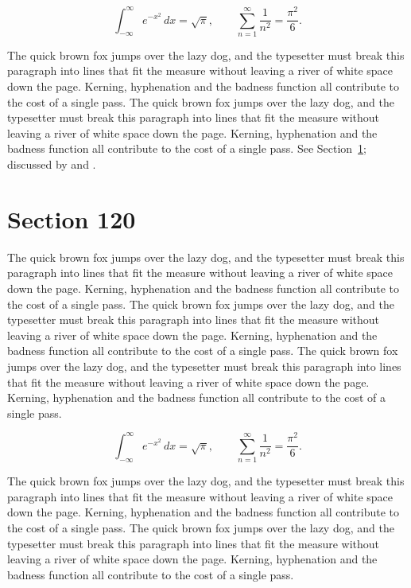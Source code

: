 \documentclass{article}
\begin{document}
\begin{equation}\label{eq:119}
\int_{-\infty}^{\infty} e^{-x^{2}}\,dx = \sqrt{\pi}, \qquad
\sum_{n=1}^{\infty} \frac{1}{n^{2}} = \frac{\pi^{2}}{6}.
\end{equation}

The quick brown fox jumps over the lazy dog, and the typesetter must break this paragraph into lines that fit the measure without leaving a river of white space down the page. Kerning, hyphenation and the badness function all contribute to the cost of a single pass. The quick brown fox jumps over the lazy dog, and the typesetter must break this paragraph into lines that fit the measure without leaving a river of white space down the page. Kerning, hyphenation and the badness function all contribute to the cost of a single pass. 
See Section~\ref{sec:120}; discussed by \textcite{k5} and \textcite{l2}.
\section{Section 120}
\label{sec:120}
The quick brown fox jumps over the lazy dog, and the typesetter must break this paragraph into lines that fit the measure without leaving a river of white space down the page. Kerning, hyphenation and the badness function all contribute to the cost of a single pass. The quick brown fox jumps over the lazy dog, and the typesetter must break this paragraph into lines that fit the measure without leaving a river of white space down the page. Kerning, hyphenation and the badness function all contribute to the cost of a single pass. The quick brown fox jumps over the lazy dog, and the typesetter must break this paragraph into lines that fit the measure without leaving a river of white space down the page. Kerning, hyphenation and the badness function all contribute to the cost of a single pass. 

\begin{equation}\label{eq:120}
\int_{-\infty}^{\infty} e^{-x^{2}}\,dx = \sqrt{\pi}, \qquad
\sum_{n=1}^{\infty} \frac{1}{n^{2}} = \frac{\pi^{2}}{6}.
\end{equation}

The quick brown fox jumps over the lazy dog, and the typesetter must break this paragraph into lines that fit the measure without leaving a river of white space down the page. Kerning, hyphenation and the badness function all contribute to the cost of a single pass. The quick brown fox jumps over the lazy dog, and the typesetter must break this paragraph into lines that fit the measure without leaving a river of white space down the page. Kerning, hyphenation and the badness function all contribute to the cost of a single pass. 
\end{document}
